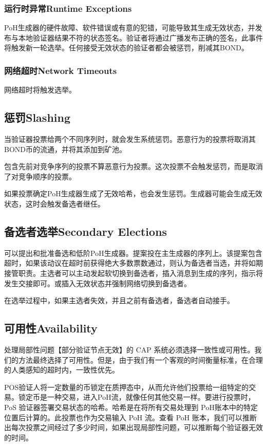 \documentclass[12pt, uft8]{ctexart}
\begin{document}
\subsubsection{运行时异常Runtime Exceptions}
PoH生成器的硬件故障、软件错误或有意的犯错，可能导致其生成无效状态，并发布与本地验证器结果不符的状态签名。验证者将通过广播发布正确的签名，此事件将触发新一轮选举。任何接受无效状态的验证者都会被惩罚，削减其BOND。

\subsubsection{网络超时Network Timeouts}

网络超时将触发选举。

\subsection{惩罚Slashing}
当验证器投票给两个不同序列时，就会发生系统惩罚。恶意行为的投票将取消其BOND币的流通，并将其添加到矿池。

包含先前对竞争序列的投票不算恶意行为投票。这次投票不会触发惩罚，而是取消了对竞争顺序的投票。

如果投票确定PoH生成器生成了无效哈希，也会发生惩罚。生成器可能会生成无效状态，这时会触发备选者继任。

\subsection{备选者选举Secondary Elections}
可以提出和批准备选和低阶PoH生成器。提案投在主生成器的序列上。该提案包含超时，如果该动议在超时前获得绝大多数票数通过，则认为备选者当选，并将如期接管职责。主选者可以主动发起软切换到备选者，插入消息到生成的序列，指示将发生交接即可。或插入无效状态并强制网络切换到备选者。  

在选举过程中，如果主选者失效，并且之前有备选者，备选者自动接手。


\subsection{可用性Availability}\label{availability}
处理局部性问题【部分验证节点无效】的 CAP 系统必须选择一致性或可用性。我们的方法最终选择了可用性。但是，由于我们有一个客观的时间衡量标准，在合理的人类感知的超时内，一致性优先。

POS验证人将一定数量的币锁定在质押态中，从而允许他们投票给一组特定的交易。锁定币是一种交易，进入PoH流，就像任何其他交易一样。要进行投票时，PoS 验证器签署交易状态的哈希。哈希是在将所有交易处理到 PoH账本中的特定位置后计算的。此投票也作为交易输入 PoH 流。查看 PoH 账本，我们可以推断出每次投票之间经过了多少时间，如果出现局部性问题，可以推断每个验证器无效的时间。
\end{document}
